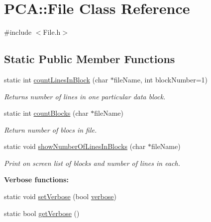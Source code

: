\hypertarget{class_p_c_a_1_1_file}{}\section{P\+CA\+:\+:File Class Reference}
\label{class_p_c_a_1_1_file}


{\ttfamily \#include $<$File.\+h$>$}

\subsection*{Static Public Member Functions}
\begin{DoxyCompactItemize}
\item 
static int \hyperlink{class_p_c_a_1_1_file_a832795e34ab12c9fd127bdf99d89efa3}{count\+Lines\+In\+Block} (char $\ast$file\+Name, int block\+Number=1)
\begin{DoxyCompactList}\small\item\em Returns number of lines in one particular data block. \end{DoxyCompactList}\item 
static int \hyperlink{class_p_c_a_1_1_file_a25bcd550fcc9e0a948f4c553b330a7a6}{count\+Blocks} (char $\ast$file\+Name)
\begin{DoxyCompactList}\small\item\em Return number of blocs in file. \end{DoxyCompactList}\item 
static void \hyperlink{class_p_c_a_1_1_file_a25dd7a0266edd1fc026f27448003b36f}{show\+Number\+Of\+Lines\+In\+Blocks} (char $\ast$file\+Name)
\begin{DoxyCompactList}\small\item\em Print on screen list of blocks and number of lines in each. \end{DoxyCompactList}\end{DoxyCompactItemize}
\begin{Indent}{\bf Verbose functions\+:}\par
\begin{DoxyCompactItemize}
\item 
static void \hyperlink{class_p_c_a_1_1_file_a71cb80c09faa4be71eb09ae074aac4b2}{set\+Verbose} (bool \hyperlink{class_p_c_a_1_1_file_a7d78765563f9be7e1ca260dcd3c65053}{verbose})
\item 
static bool \hyperlink{class_p_c_a_1_1_file_aa080868b37deb641c3369c397f84fd1b}{get\+Verbose} ()
\end{DoxyCompactItemize}
\end{Indent}
